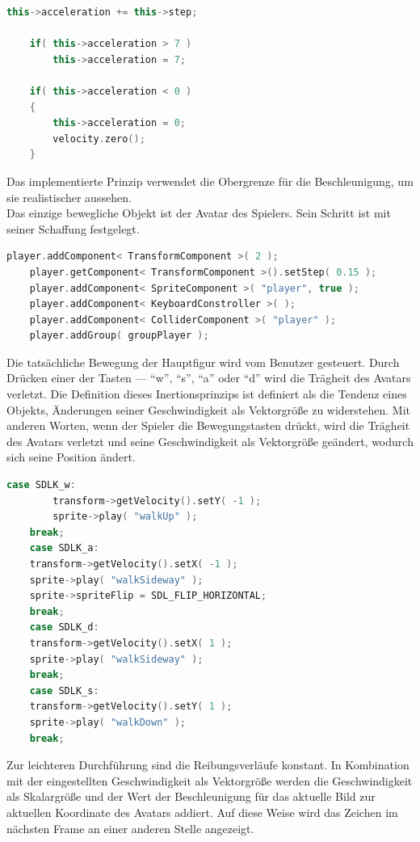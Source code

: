 \documentclass[
  10pt,
  a4paper,
  oneside,
  headers,
  headinclude,
  footinclude,
  BCOR5mm,
]{article}
\begin{document}
\begin{lstlisting}[language=C++]
    this->acceleration += this->step;

    if( this->acceleration > 7 )
        this->acceleration = 7;

    if( this->acceleration < 0 )
    {
        this->acceleration = 0;
        velocity.zero();
    }
\end{lstlisting}

Das implementierte Prinzip verwendet die Obergrenze für die Beschleunigung, um
sie realistischer aussehen.\\
Das einzige bewegliche Objekt ist der Avatar des Spielers. Sein Schritt ist mit
seiner Schaffung festgelegt.

\begin{lstlisting}[language=C++]
    player.addComponent< TransformComponent >( 2 );
    player.getComponent< TransformComponent >().setStep( 0.15 );
    player.addComponent< SpriteComponent >( "player", true );
    player.addComponent< KeyboardConstroller >( );
    player.addComponent< ColliderComponent >( "player" );
    player.addGroup( groupPlayer );
\end{lstlisting}

Die tatsächliche Bewegung der Hauptfigur wird vom Benutzer gesteuert. Durch
Drücken einer der Tasten --- ``w'', ``s'', ``a'' oder ``d'' wird die Trägheit des
Avatars verletzt. Die Definition dieses Inertionsprinzips ist definiert als die
Tendenz eines Objekts, Änderungen seiner Geschwindigkeit als Vektorgröße zu
widerstehen. Mit anderen Worten, wenn der Spieler die Bewegungstasten drückt,
wird die Trägheit des Avatars verletzt und seine Geschwindigkeit als Vektorgröße
geändert, wodurch sich seine Position ändert. \\

\begin{lstlisting}[language=C++]
    case SDLK_w:
        transform->getVelocity().setY( -1 );
        sprite->play( "walkUp" );
	break;
    case SDLK_a:
	transform->getVelocity().setX( -1 );
	sprite->play( "walkSideway" );
	sprite->spriteFlip = SDL_FLIP_HORIZONTAL;
	break;
    case SDLK_d:
	transform->getVelocity().setX( 1 );
	sprite->play( "walkSideway" );
	break;
    case SDLK_s:
	transform->getVelocity().setY( 1 );
	sprite->play( "walkDown" );
	break;
\end{lstlisting}

Zur leichteren Durchführung sind die Reibungsverläufe konstant. In Kombination
mit der eingestellten Geschwindigkeit als Vektorgröße werden die Geschwindigkeit
als Skalargröße und der Wert der Beschleunigung für das aktuelle Bild zur
aktuellen Koordinate des Avatars addiert. Auf diese Weise wird das Zeichen im
nächsten Frame an einer anderen Stelle angezeigt.
\end{document}
